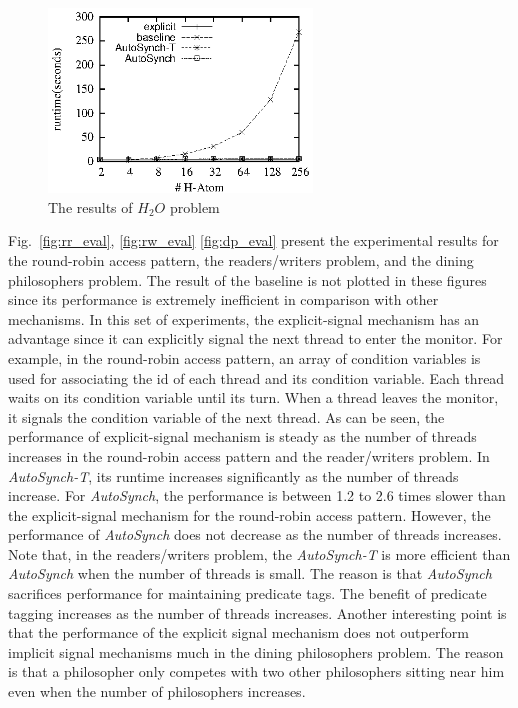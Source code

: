 \documentclass{sigplanconf}
\begin{document}
\begin{figure}[ht!]
  \centering
  \includegraphics[width=70mm]{fig/h2o.eps}
  \caption{The results of $H_2O$ problem}
  \label{fig:h2o_eval}
\end{figure}




Fig.~\ref{fig:rr_eval}, \ref{fig:rw_eval} \ref{fig:dp_eval} present the experimental results for
the round-robin access pattern, the readers/writers problem, %
and the dining philosophers problem. The result of the
baseline is not plotted in these figures since its performance is extremely
inefficient in comparison with other mechanisms.  In this set of experiments, 
the explicit-signal mechanism has an advantage since it can explicitly signal 
the next thread to enter the monitor. For example, in the round-robin access
pattern, an array of condition variables is used for associating the id of each
thread and its condition variable. Each thread waits on its condition variable
until its turn. When a thread leaves the monitor, it signals the condition 
variable of the next thread. As can be seen, the performance of 
explicit-signal mechanism is steady as the number of threads increases in
the round-robin access pattern and the reader/writers problem. In 
{\em AutoSynch-T}, its runtime increases significantly as the 
number of threads increase. For {\em AutoSynch}, the performance is between 1.2 
to 2.6 times slower than the explicit-signal mechanism for the round-robin access
pattern. However, the performance of {\em AutoSynch} does not decrease as the 
number of threads increases. Note that, in the readers/writers problem, the
{\em AutoSynch-T} is more efficient than {\em AutoSynch} when the number of
threads is small. The reason is that {\em AutoSynch} sacrifices performance for
maintaining predicate tags. The benefit of predicate tagging increases as the
number of threads increases. Another interesting point is that the
performance of the explicit signal mechanism does not outperform implicit
signal mechanisms much in the dining philosophers problem. The reason is that
a philosopher only competes with two other philosophers sitting near him even
when the number of philosophers increases. 
\end{document}
